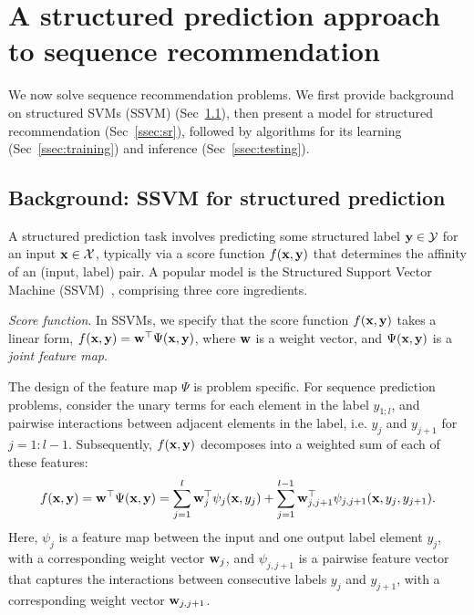 \secmoveup
\section{A structured prediction approach to sequence recommendation}
\label{sec:recseq}
\textmoveup

We now   %
solve sequence recommendation problems. %
We first provide background on structured SVMs (SSVM) (Sec~\ref{ssec:ssvm}),
then present a model for structured recommendation (Sec~\ref{ssec:sr}),
followed by  algorithms for its learning (Sec~\ref{ssec:training}) 
and inference (Sec~\ref{ssec:testing}).


\secmoveup
\subsection{Background: SSVM for structured prediction}
\label{ssec:ssvm}
\textmoveup

A structured prediction task involves predicting some structured label $\mathbf{y} \in \mathcal{Y}$ for an input $\mathbf{x} \in \mathcal{X}$,
typically via a score function $f(\mathbf{x},\mathbf{y})$ that determines the affinity of an (input, label) pair.
A popular model is the Structured Support Vector Machine (SSVM)~\cite{joachims2009predicting,tsochantaridis2005large}, comprising three core ingredients.

\emph{Score function}. In SSVMs, we specify that the score function $f(\mathbf{x}, \mathbf{y})$ takes a linear form, \ie 
$f(\mathbf{x}, \mathbf{y}) = \mathbf{w}^\top \Psi(\mathbf{x}, \mathbf{y})$,
where $\mathbf{w}$ is a weight vector, and $\Psi(\mathbf{x}, \mathbf{y})$ is a \emph{joint feature map}.

The design of the feature map $\Psi$ is problem specific.
For sequence prediction problems,
consider the unary 
terms for each element in the label $y_{1:l}$, and pairwise interactions between
adjacent elements in the label,
i.e. $y_j$ and $y_{j+1}$ for $j=1 : l \!-\! 1$.
Subsequently, $f(\mathbf{x},\mathbf{y})$ decomposes into a weighted sum of
each of these features: %
\begin{equation}
\label{eq:jointfeature}
f(\x, \y) = \w^\top \Psi(\x, \y) = 
\sum_{j=1}^l \w_j^\top \psi_j(\x, y_j) + \sum_{j=1}^{l-1} \w_{j,j+1}^\top \psi_{j,j+1}(\x, y_{j}, y_{j+1}).
\eqmoveup
\end{equation}
Here, $\psi_j$ is a feature map between the input and one output label element $y_j$, with a corresponding weight vector $\mathbf{w}_j$,
and $\psi_{j,j+1}$ is a pairwise feature vector that captures the interactions between consecutive labels $y_j$ and $y_{j+1}$,
with a corresponding weight vector $\mathbf{w}_{j,j+1}$.

